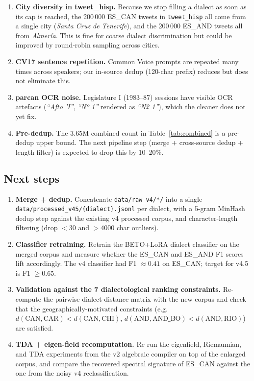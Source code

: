 \documentclass[11pt,a4paper]{article}
\begin{document}
\begin{enumerate}
  \item \textbf{City diversity in tweet\_hisp.} Because we stop filling a
        dialect as soon as its cap is reached, the 200\,000 ES\_CAN
        tweets in \texttt{tweet\_hisp} all come from a single city
        (\emph{Santa Cruz de Tenerife}), and the 200\,000 ES\_AND tweets
        all from \emph{Almería}. This is fine for coarse dialect
        discrimination but could be improved by round-robin sampling
        across cities.
  \item \textbf{CV17 sentence repetition.} Common Voice prompts are
        repeated many times across speakers; our in-source dedup
        (120-char prefix) reduces but does not eliminate this.
  \item \textbf{parcan OCR noise.} Legislature I (1983--87) sessions
        have visible OCR artefacts
        (\emph{``Afto 'I''}, \emph{``Nº 1''} rendered as \emph{``N2 1''}),
        which the cleaner does not yet fix.
  \item \textbf{Pre-dedup.} The $3.65$M combined count in
        Table~\ref{tab:combined} is a pre-dedup upper bound. The next
        pipeline step (merge + cross-source dedup + length filter) is
        expected to drop this by 10--20\%.
\end{enumerate}

\subsection{Next steps}

\begin{enumerate}
  \item \textbf{Merge + dedup.} Concatenate \texttt{data/raw\_v4/*/} into
        a single \texttt{data/processed\_v45/\{dialect\}.jsonl} per
        dialect, with a 5-gram MinHash dedup step against the existing
        v4 processed corpus, and character-length filtering (drop
        $<\!30$ and $>\!4000$ char outliers).
  \item \textbf{Classifier retraining.} Retrain the BETO+LoRA dialect
        classifier on the merged corpus and measure whether the ES\_CAN
        and ES\_AND F1 scores lift accordingly. The v4 classifier had
        F1 $\approx 0.41$ on ES\_CAN; target for v4.5 is F1 $\geq 0.65$.
  \item \textbf{Validation against the 7 dialectological ranking
        constraints.} Re-compute the pairwise dialect-distance matrix
        with the new corpus and check that the geographically-motivated
        constraints (e.g.\ $d(\mathrm{CAN},\mathrm{CAR}) <
        d(\mathrm{CAN},\mathrm{CHI})$, $d(\mathrm{AND},\mathrm{AND\_BO})
        < d(\mathrm{AND},\mathrm{RIO})$) are satisfied.
  \item \textbf{TDA + eigen-field recomputation.} Re-run the eigenfield,
        Riemannian, and TDA experiments from the v2 algebraic compiler
        on top of the enlarged corpus, and compare the recovered
        spectral signature of ES\_CAN against the one from the noisy v4
        reclassification.
\end{enumerate}
\end{document}
